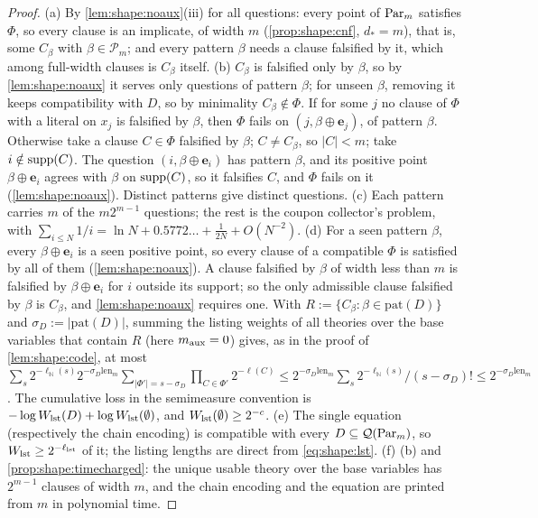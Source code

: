 \begin{proof}
(a) By \cref{lem:shape:noaux}(iii) for all questions: every point of $\mathrm{Par}_m$ satisfies $\Phi$, so every clause is an implicate, of width $m$ (\cref{prop:shape:cnf}, $d_*=m$), that is, some $C_\beta$ with $\beta\in\mathcal P_m$; and every pattern $\beta$ needs a clause falsified by it, which among full-width clauses is $C_\beta$ itself.
(b) $C_\beta$ is falsified only by $\beta$, so by \cref{lem:shape:noaux} it serves only questions of pattern $\beta$; for unseen $\beta$, removing it keeps compatibility with $D$, so by minimality $C_\beta\notin\Phi$. If for some $j$ no clause of $\Phi$ with a literal on $x_j$ is falsified by $\beta$, then $\Phi$ fails on $(j,\beta\oplus\mathbf e_j)$, of pattern $\beta$. Otherwise take a clause $C\in\Phi$ falsified by $\beta$; $C\ne C_\beta$, so $\lvert C\rvert<m$; take $i\notin\operatorname{supp}(C)$. The question $(i,\beta\oplus\mathbf e_i)$ has pattern $\beta$, and its positive point $\beta\oplus\mathbf e_i$ agrees with $\beta$ on $\operatorname{supp}(C)$, so it falsifies $C$, and $\Phi$ fails on it (\cref{lem:shape:noaux}). Distinct patterns give distinct questions.
(c) Each pattern carries $m$ of the $m2^{m-1}$ questions; the rest is the coupon collector's problem, with $\sum_{i\le N}1/i=\ln N+0.5772\ldots+\frac1{2N}+O(N^{-2})$.
(d) For a seen pattern $\beta$, every $\beta\oplus\mathbf e_i$ is a seen positive point, so every clause of a compatible $\Phi$ is satisfied by all of them (\cref{lem:shape:noaux}). A clause falsified by $\beta$ of width less than $m$ is falsified by $\beta\oplus\mathbf e_i$ for $i$ outside its support; so the only admissible clause falsified by $\beta$ is $C_\beta$, and \cref{lem:shape:noaux} requires one. With $R:=\{C_\beta:\beta\in\mathrm{pat}(D)\}$ and $\sigma_D:=\lvert\mathrm{pat}(D)\rvert$, summing the listing weights of all theories over the base variables that contain $R$ (here $m_{\rm aux}=0$) gives, as in the proof of \cref{lem:shape:code}, at most $\sum_s2^{-\ell_{\mathbb N}(s)}2^{-\sigma_D\mathrm{len}_m}\sum_{\lvert\Phi'\rvert=s-\sigma_D}\prod_{C\in\Phi'}2^{-\ell(C)}\le2^{-\sigma_D\mathrm{len}_m}\sum_s2^{-\ell_{\mathbb N}(s)}/(s-\sigma_D)!\le2^{-\sigma_D\mathrm{len}_m}$. The cumulative loss in the semimeasure convention is $-\log W_{\mathrm{lst}}(D)+\log W_{\mathrm{lst}}(\emptyset)$, and $W_{\mathrm{lst}}(\emptyset)\ge2^{-c}$.
(e) The single equation (respectively the chain encoding) is compatible with every $D\subseteq\mathcal Q(\mathrm{Par}_m)$, so $W_{\mathrm{lst}}\ge2^{-\ell_{\rm lst}}$ of it; the listing lengths are direct from \eqref{eq:shape:lst}.
(f) (b) and \cref{prop:shape:timecharged}: the unique usable theory over the base variables has $2^{m-1}$ clauses of width $m$, and the chain encoding and the equation are printed from $m$ in polynomial time.
\end{proof}


